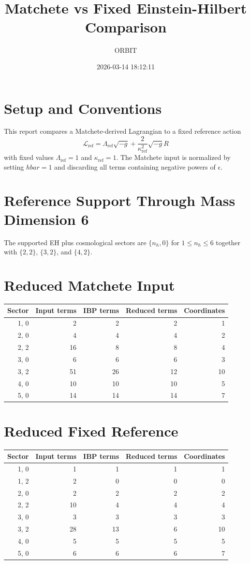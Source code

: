 \documentclass[11pt]{article}
\title{Matchete vs Fixed Einstein-Hilbert Comparison}
\author{ORBIT}
\date{2026-03-14 18:12:11}
\begin{document}
\maketitle
\tableofcontents
\section{Setup and Conventions}
This report compares a Matchete-derived Lagrangian to a fixed reference action
\begin{equation}
\mathcal{L}_{\mathrm{ref}} = \Lambda_{\mathrm{ref}} \sqrt{-g} + \frac{2}{\kappa_{\mathrm{ref}}^2} \sqrt{-g} R
\end{equation}
with fixed values $\Lambda_{\mathrm{ref}} = 1$ and $\kappa_{\mathrm{ref}} = 1$.
The Matchete input is normalized by setting $hbar = 1$ and discarding all terms containing negative powers of $\epsilon$.
\section{Reference Support Through Mass Dimension 6}
The supported EH plus cosmological sectors are $\{n_h, 0\}$ for $1 \le n_h \le 6$ together with $\{2,2\}$, $\{3,2\}$, and $\{4,2\}$.
\section{Reduced Matchete Input}
\begin{longtable}{rrrrr}
\toprule
Sector & Input terms & IBP terms & Reduced terms & Coordinates \\
\midrule
{1, 0} & 2 & 2 & 2 & 1 \\
{2, 0} & 4 & 4 & 4 & 2 \\
{2, 2} & 16 & 8 & 8 & 4 \\
{3, 0} & 6 & 6 & 6 & 3 \\
{3, 2} & 51 & 26 & 12 & 10 \\
{4, 0} & 10 & 10 & 10 & 5 \\
{5, 0} & 14 & 14 & 14 & 7 \\
\bottomrule
\end{longtable}
\section{Reduced Fixed Reference}
\begin{longtable}{rrrrr}
\toprule
Sector & Input terms & IBP terms & Reduced terms & Coordinates \\
\midrule
{1, 0} & 1 & 1 & 1 & 1 \\
{1, 2} & 2 & 0 & 0 & 0 \\
{2, 0} & 2 & 2 & 2 & 2 \\
{2, 2} & 10 & 4 & 4 & 4 \\
{3, 0} & 3 & 3 & 3 & 3 \\
{3, 2} & 28 & 13 & 6 & 10 \\
{4, 0} & 5 & 5 & 5 & 5 \\
{5, 0} & 6 & 6 & 6 & 7 \\
\bottomrule
\end{longtable}
\end{document}

